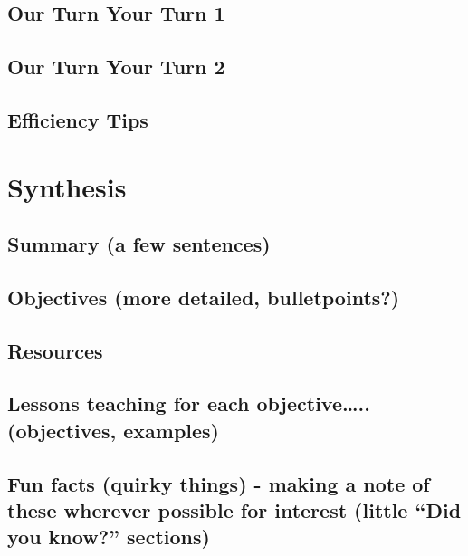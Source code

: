 \documentclass[]{book}
\begin{document}
\hypertarget{our-turn-your-turn-1-3}{%
\section{Our Turn Your Turn 1}\label{our-turn-your-turn-1-3}}

\hypertarget{our-turn-your-turn-2-4}{%
\section{Our Turn Your Turn 2}\label{our-turn-your-turn-2-4}}

\hypertarget{efficiency-tips-6}{%
\section{Efficiency Tips}\label{efficiency-tips-6}}

\hypertarget{synthesis}{%
\chapter{Synthesis}\label{synthesis}}

\hypertarget{summary-a-few-sentences-5}{%
\section{Summary (a few sentences)}\label{summary-a-few-sentences-5}}

\hypertarget{objectives-more-detailed-bulletpoints-5}{%
\section{Objectives (more detailed, bulletpoints?)}\label{objectives-more-detailed-bulletpoints-5}}

\hypertarget{resources-7}{%
\section{Resources}\label{resources-7}}

\hypertarget{lessons-teaching-for-each-objective..-objectives-examples-3}{%
\section{Lessons teaching for each objective\ldots{}.. (objectives, examples)}\label{lessons-teaching-for-each-objective..-objectives-examples-3}}

\hypertarget{fun-facts-quirky-things---making-a-note-of-these-wherever-possible-for-interest-little-did-you-know-sections-4}{%
\section{Fun facts (quirky things) - making a note of these wherever possible for interest (little ``Did you know?'' sections)}\label{fun-facts-quirky-things---making-a-note-of-these-wherever-possible-for-interest-little-did-you-know-sections-4}}
\end{document}

